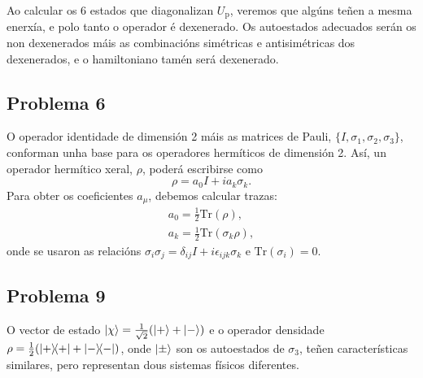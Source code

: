 \documentclass[a4paper,12pt]{article}
\begin{document}
Ao calcular os 6 estados que diagonalizan $U_\mathrm{p}$, veremos que algúns teñen a mesma enerxía, e polo tanto o operador é dexenerado. Os autoestados adecuados serán os non dexenerados máis as combinacións simétricas e antisimétricas dos dexenerados, e o hamiltoniano tamén será dexenerado.

\subsection*{Problema 6}

O operador identidade de dimensión 2 máis as matrices de Pauli, $\{I,\sigma_1,\sigma_2,\sigma_3\}$, conforman unha base para os operadores hermíticos de dimensión 2. Así, un operador hermítico xeral, $\rho$, poderá escribirse como
\begin{equation}
	\rho = a_0 I + i a_k \sigma_k.
\end{equation}
\noindent
Para obter os coeficientes $a_\mu$, debemos calcular trazas:
\begin{equation}
\begin{gathered}
	a_0 = \frac{1}{2}\mathrm{Tr}(\rho), \\
	a_k = \frac{1}{2} \mathrm{Tr}(\sigma_k \rho),
\end{gathered}
\end{equation}
\noindent
onde se usaron as relacións $\sigma_i \sigma_j = \delta_{ij}I + i\epsilon_{ijk}\sigma_k $ e $\mathrm{Tr}(\sigma_i) = 0$.

\subsection*{Problema 9}

O vector de estado $\ket{\chi} = \frac{1}{\sqrt{2}} (\ket{+} + \ket{-})$ e o operador densidade $\rho = \frac{1}{2} (\ketbra{+}{+} + \ketbra{-}{-})$, onde $\ket{\pm}$ son os autoestados de $\sigma_3$, teñen características similares, pero representan dous sistemas físicos diferentes.
\end{document}
